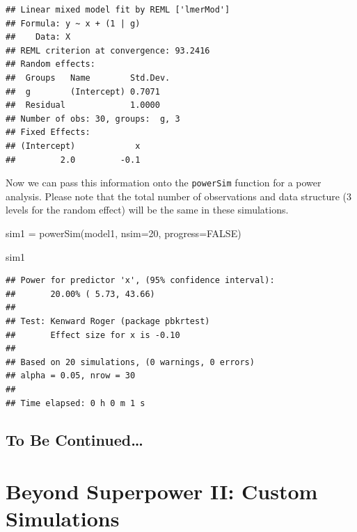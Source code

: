 \documentclass[
]{book}
\newenvironment{Shaded}{\begin{snugshade}}{\end{snugshade}}
\newcommand{\AttributeTok}[1]{\textcolor[rgb]{0.77,0.63,0.00}{#1}}
\newcommand{\ConstantTok}[1]{\textcolor[rgb]{0.00,0.00,0.00}{#1}}
\newcommand{\DecValTok}[1]{\textcolor[rgb]{0.00,0.00,0.81}{#1}}
\newcommand{\FunctionTok}[1]{\textcolor[rgb]{0.00,0.00,0.00}{#1}}
\newcommand{\NormalTok}[1]{#1}
\newcommand{\OtherTok}[1]{\textcolor[rgb]{0.56,0.35,0.01}{#1}}
\begin{document}
\begin{verbatim}
## Linear mixed model fit by REML ['lmerMod']
## Formula: y ~ x + (1 | g)
##    Data: X
## REML criterion at convergence: 93.2416
## Random effects:
##  Groups   Name        Std.Dev.
##  g        (Intercept) 0.7071  
##  Residual             1.0000  
## Number of obs: 30, groups:  g, 3
## Fixed Effects:
## (Intercept)            x  
##         2.0         -0.1
\end{verbatim}

Now we can pass this information onto the \texttt{powerSim} function for a power analysis. Please note that the total number of observations and data structure (3 levels for the random effect) will be the same in these simulations.

\begin{Shaded}
\begin{Highlighting}[]
\NormalTok{sim1 }\OtherTok{=} \FunctionTok{powerSim}\NormalTok{(model1, }
                \AttributeTok{nsim=}\DecValTok{20}\NormalTok{, }
                \AttributeTok{progress=}\ConstantTok{FALSE}\NormalTok{)}
\end{Highlighting}
\end{Shaded}

\begin{Shaded}
\begin{Highlighting}[]
\NormalTok{sim1}
\end{Highlighting}
\end{Shaded}

\begin{verbatim}
## Power for predictor 'x', (95% confidence interval):
##       20.00% ( 5.73, 43.66)
## 
## Test: Kenward Roger (package pbkrtest)
##       Effect size for x is -0.10
## 
## Based on 20 simulations, (0 warnings, 0 errors)
## alpha = 0.05, nrow = 30
## 
## Time elapsed: 0 h 0 m 1 s
\end{verbatim}

\hypertarget{to-be-continued}{%
\section{To Be Continued\ldots{}}\label{to-be-continued}}

\hypertarget{beyond-superpower-ii-custom-simulations}{%
\chapter{Beyond Superpower II: Custom Simulations}\label{beyond-superpower-ii-custom-simulations}}
\end{document}
